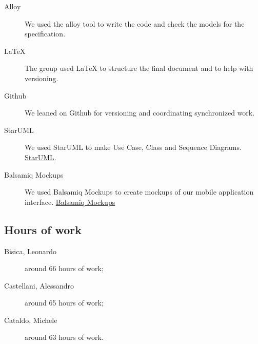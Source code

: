 \documentclass[12pt, a4paper]{article}
\begin{document}
		\begin{description}
			\item [Alloy] We used the alloy tool to write the code and check the models for the specification.
			\item [LaTeX] The group used LaTeX to structure the final document and to help with versioning.
			\item [Github] We leaned on Github for versioning and coordinating synchronized work.
			\item[StarUML] We used StarUML  to make Use Case, Class and Sequence Diagrams. \href{http://staruml.io/}{StarUML}.
			\item[Balsamiq Mockups] We used Balsamiq Mockups to create mockups of our mobile application interface. \href{https://balsamiq.com/products/mockups/}{Balsamiq Mockups}
			
		\end{description}
		
		\subsection{Hours of work}
			\begin{description}
				\item[Bisica, Leonardo] around 66 hours of work;
				\item[Castellani, Alessandro] around 65 hours of work;
				\item[Cataldo, Michele] around 63 hours of work.
			\end{description}
			
\end{document}
